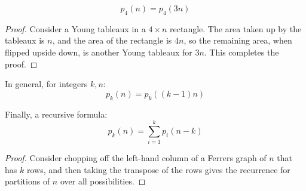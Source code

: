 \documentclass[11pt,twosided]{article}
\begin{document}
\begin{theorem}
\[
	p_4(n) = p_4(3n)
\]
\end{theorem}
\begin{proof}
Consider a Young tableaux in a $4 \times n$ rectangle. The area taken up by the tableaux is $n$, and the area of the rectangle is $4n$, so the remaining area, when flipped upside down, is another Young tableaux for $3n$. This completes the proof. 

\end{proof}

In general, for integers $k, n$: 
\[
	p_k(n) = p_k((k-1)n)
\]

Finally, a recursive formula: 
\[
	p_k(n) = \sum_{i=1}^k p_i(n-k)
\]

\begin{proof}
Consider chopping off the left-hand column of a Ferrers graph of $n$ that has $k$ rows, and then taking the transpose of the rows gives the recurrence for partitions of $n$ over all possibilities. 

\end{proof}
\end{document}

